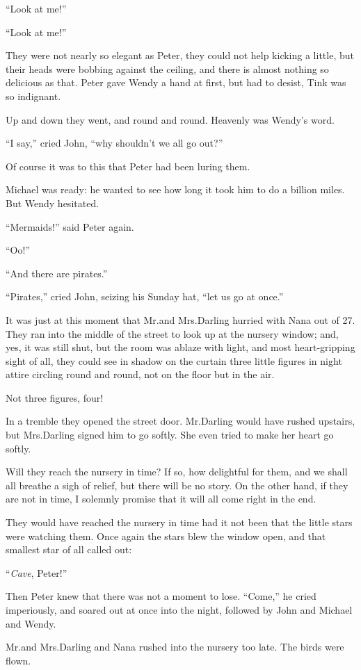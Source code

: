 “Look at me!”

“Look at me!”

They were not nearly so elegant as Peter, they could not help kicking a little,
but their heads were bobbing against the ceiling,
and there is almost nothing so delicious as that.
Peter gave Wendy a hand at first, but had to desist, Tink was so indignant.

Up and down they went, and round and round.
Heavenly was Wendy’s word.

“I say,” cried John, “why shouldn’t we all go out?”

Of course it was to this that Peter had been luring them.

Michael was ready:
he wanted to see how long it took him to do a billion miles.
But Wendy hesitated.

“Mermaids!\@” said Peter again.

“Oo!”

“And there are pirates.”

“Pirates,” cried John, seizing his Sunday hat, “let us go at once.”

It was just at this moment that Mr.\@ and Mrs.\@ Darling hurried with Nana out of 27.
They ran into the middle of the street to look up at the nursery window;
and, yes, it was still shut,
but the room was ablaze with light,
and most heart‐gripping sight of all,
they could see in shadow on the curtain three little figures in night attire circling round and round,
not on the floor but in the air.

Not three figures, four!

In a tremble they opened the street door.
Mr.\@ Darling would have rushed upstairs, but Mrs.\@ Darling signed him to go softly.
She even tried to make her heart go softly.

Will they reach the nursery in time?
If so, how delightful for them, and we shall all breathe a sigh of relief, but there will be no story.
On the other hand, if they are not in time, I solemnly promise that it will all come right in the end.

They would have reached the nursery in time had it not been that the little stars were watching them.
Once again the stars blew the window open, and that smallest star of all called out:

“\emph{Cave}, Peter!”

Then Peter knew that there was not a moment to lose.
“Come,” he cried imperiously, and soared out at once into the night,
followed by John and Michael and Wendy.

Mr.\@ and Mrs.\@ Darling and Nana rushed into the nursery too late.
The birds were flown.

\endinput

